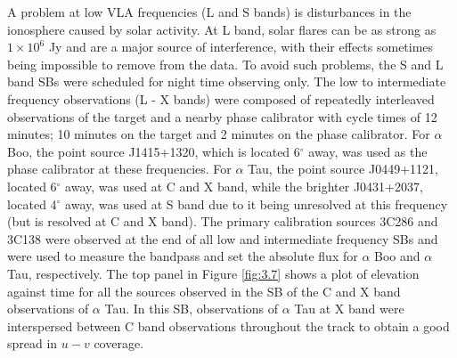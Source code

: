 A problem at low VLA frequencies (L and S bands) is disturbances in the ionosphere caused by solar activity. At L band, solar flares can be as strong as $1 \times 10^6$ Jy and are a major source of interference, with their effects sometimes being impossible to remove from the data. To avoid such problems, the S and L band SBs were scheduled for night time observing only. The low to intermediate frequency observations (L - X bands) were composed of repeatedly interleaved observations of the target and a nearby phase calibrator with cycle times of 12 minutes; 10 minutes on the target and 2 minutes on the phase calibrator. For $\alpha$ Boo, the point source J1415+1320, which is located 6$^{\circ}$ away, was used as the phase calibrator at these frequencies. For $\alpha$ Tau, the point source J0449+1121, located 6$^{\circ}$ away, was used at C and X band, while the brighter J0431+2037, located 4$^{\circ}$ away, was used at S band due to it being unresolved at this frequency (but is resolved at C and X band). The primary calibration sources 3C286 and 3C138 were observed at the end of all low and intermediate frequency SBs and were used to measure the bandpass and set the absolute flux for $\alpha$ Boo and $\alpha$ Tau, respectively. The top panel in Figure \ref{fig:3.7} shows a plot of elevation against time for all the sources observed in the SB of the C and X band observations of $\alpha$ Tau. In this SB, observations of $\alpha$ Tau at X band were interspersed between C band observations throughout the track to obtain a good spread in $u-v$ coverage. 

